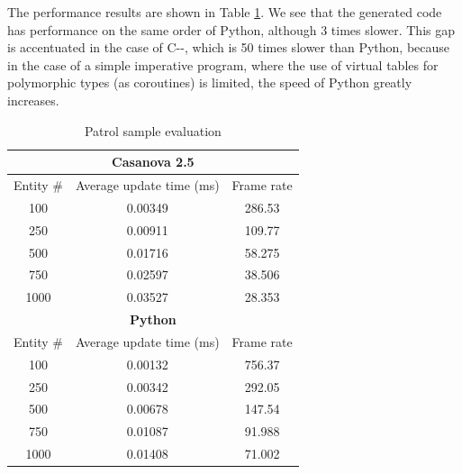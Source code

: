 The performance results are shown in Table \ref{tab:ch_mcnv_casanova_evaluation}. We see that the generated code has performance on the same order of Python, although 3 times slower. This gap is accentuated in the case of C-{}-, which is 50 times slower than Python, because in the case of a simple imperative program, where the use of virtual tables for polymorphic types (as coroutines) is limited, the speed of Python greatly increases.

\begin{table}
	\centering
	\begin{tabular}{|c|c|c|}
		\hline
		\multicolumn{3}{|c|}{\textbf{Casanova 2.5}} \\
		\hline
		Entity \# & Average update time (ms) & Frame rate \\
		\hline
		100 & 0.00349 & 286.53 \\
		\hline
		250 & 0.00911 & 109.77 \\
		\hline
		500 & 0.01716 & 58.275 \\
		\hline
		750 & 0.02597 & 38.506 \\
		\hline
		1000 & 0.03527 & 28.353 \\
		\hline
		\multicolumn{3}{|c|}{\textbf{Python}} \\
		\hline
		Entity \# & Average update time (ms) & Frame rate \\
		\hline
		100 & 0.00132 & 756.37 \\
		\hline
		250 & 0.00342 & 292.05 \\
		\hline
		500 & 0.00678 & 147.54 \\
		\hline
		750 & 0.01087 & 91.988 \\
		\hline
		1000 & 0.01408 & 71.002 \\
		\hline
	\end{tabular}
	\caption{Patrol sample evaluation}
	\label{tab:ch_mcnv_casanova_evaluation}
\end{table}

